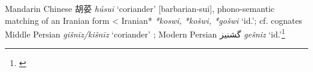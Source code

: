 \begin{etymology}\label{ety:husui}
Mandarin Chinese {胡荽} \textit{húsuī} `coriander' [barbarian-sui], phono-semantic matching of an Iranian form
< Iranian* \textit{*koswi, *košwi, *gošwi} `id.'; cf. cognates Middle Persian \textit{gišnīz/kišnīz} `coriander'  ; Modern Persian گشنیز \textit{gešniz} `id.'\footnote{\textcite{laufer_sino-iranica_1919}}
\end{etymology}